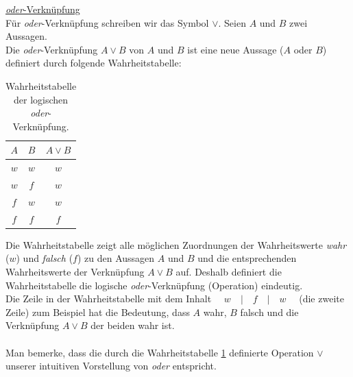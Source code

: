 \noindent
\underline{\textit{oder}-Verknüpfung}\\
Für \textit{oder}-Verknüpfung schreiben wir das Symbol $\lor$. Seien $A$ und $B$ zwei Aussagen.\\
Die \textit{oder}-Verknüpfung $A\lor B$  von $A$ und $B$ ist eine neue Aussage ($A$ oder $B$) definiert durch folgende Wahrheitstabelle:
\begin{table}[H]
	\begin{center}
		\begin{tabular}{c|c|c}
			$A$ & $B$ & $A\lor B$ \\ \hline
			$w$ & $w$ & $w$       \\
			$w$ & $f$ & $w$       \\
			$f$ & $w$ & $w$       \\
			$f$ & $f$ & $f$
		\end{tabular}
	\end{center}
	\caption{Wahrheitstabelle der logischen \textit{oder}-Verknüpfung.}
	\label{table:oder}
\end{table}

\noindent
Die Wahrheitstabelle zeigt alle möglichen Zuordnungen der Wahrheitswerte \textit{wahr} ($w$) und \textit{falsch} ($f$) zu den Aussagen $A$ und $B$ und die entsprechenden Wahrheitswerte der Verknüpfung $A\lor B$ auf. Deshalb definiert die Wahrheitstabelle die logische \textit{oder}-Verknüpfung (Operation) eindeutig.\\
Die Zeile in der Wahrheitstabelle mit dem Inhalt $\quad w \quad | \quad f \quad | \quad w \quad$ (die zweite Zeile) zum Beispiel hat die Bedeutung, dass $A$ wahr, $B$ falsch und die Verknüpfung $A\lor B$ der beiden wahr ist.\\
\\

\noindent
Man bemerke, dass die durch die Wahrheitstabelle \cref{table:oder} definierte Operation $\lor$ unserer intuitiven Vorstellung von \textit{oder} entspricht.\\

